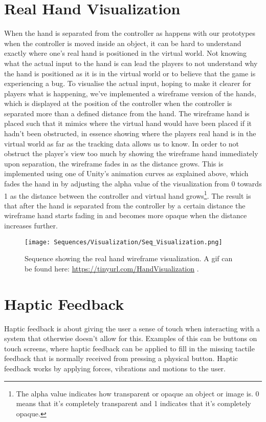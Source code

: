 \section{Real Hand Visualization}
\label{sec:handVisualization}
When the hand is separated from the controller as happens with our prototypes when the controller is moved inside an object, it can be hard to understand exactly where one's real hand is positioned in the virtual world. Not knowing what the actual input to the hand is can lead the players to not understand why the hand is positioned as it is in the virtual world or to believe that the game is experiencing a bug. To visualise the actual input, hoping to make it clearer for players what is happening, we've implemented a wireframe version of the hands, which is displayed at the position of the controller when the controller is separated more than a defined distance from the hand. The wireframe hand is placed such that it mimics where the virtual hand would have been placed if it hadn't been obstructed, in essence showing where the players real hand is in the virtual world as far as the tracking data allows us to know. In order to not obstruct the player's view too much by showing the wireframe hand immediately upon separation, the wireframe fades in as the distance grows. This is implemented using one of Unity's animation curves as explained above, which fades the hand in by adjusting the alpha value of the visualization from 0 towards 1 as the distance between the controller and virtual hand grows\footnote{The alpha value indicates how transparent or opaque an object or image is. 0 means that it's completely transparent and 1 indicates that it's completely opaque.}. The result is that after the hand is separated from the controller by a certain distance the wireframe hand starts fading in and becomes more opaque when the distance increases further.

\begin{figure}[h]
\centering
\texttt{[image: Sequences/Visualization/Seq\_Visualization.png]}
\caption{Sequence showing the real hand wireframe visualization. A gif can be found here: \url{https://tinyurl.com/HandVisualization} .}
\label{fig:visualization}
\end{figure}

\section{Haptic Feedback}
\label{sec:hapticFeedback}
Haptic feedback is about giving the user a sense of touch when interacting with a system that otherwise doesn't allow for this. Examples of this can be buttons on touch screens, where haptic feedback can be applied to fill in the missing tactile feedback that is normally received from pressing a physical button. Haptic feedback works by applying forces, vibrations and motions to the user.

